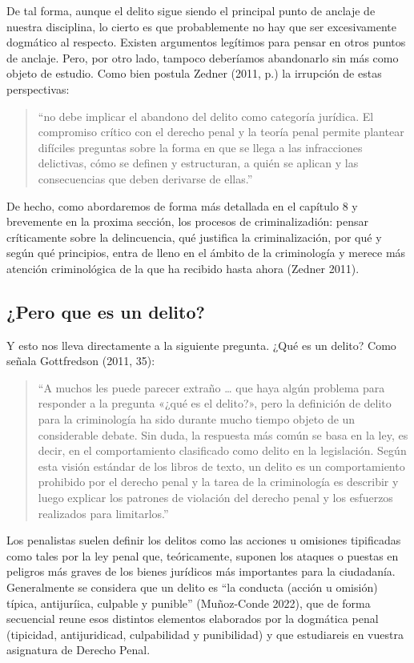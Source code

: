 \documentclass[
  spanish,
  letterpaper,
  DIV=11,
  numbers=noendperiod]{scrreprt}
\begin{document}
De tal forma, aunque el delito sigue siendo el principal punto de
anclaje de nuestra disciplina, lo cierto es que probablemente no hay que
ser excesivamente dogmático al respecto. Existen argumentos legítimos
para pensar en otros puntos de anclaje. Pero, por otro lado, tampoco
deberíamos abandonarlo sin más como objeto de estudio. Como bien postula
Zedner (2011, p.) la irrupción de estas perspectivas:

\begin{quote}
``no debe implicar el abandono del delito como categoría jurídica. El
compromiso crítico con el derecho penal y la teoría penal permite
plantear difíciles preguntas sobre la forma en que se llega a las
infracciones delictivas, cómo se definen y estructuran, a quién se
aplican y las consecuencias que deben derivarse de ellas.''
\end{quote}

De hecho, como abordaremos de forma más detallada en el capítulo 8 y
brevemente en la proxima sección, los procesos de criminalizadión:
pensar críticamente sobre la delincuencia, qué justifica la
criminalización, por qué y según qué principios, entra de lleno en el
ámbito de la criminología y merece más atención criminológica de la que
ha recibido hasta ahora (Zedner 2011).

\subsection{¿Pero que es un delito?}\label{pero-que-es-un-delito}

Y esto nos lleva directamente a la siguiente pregunta. ¿Qué es un
delito? Como señala Gottfredson (2011, 35):

\begin{quote}
``A muchos les puede parecer extraño \ldots{} que haya algún problema
para responder a la pregunta «¿qué es el delito?», pero la definición de
delito para la criminología ha sido durante mucho tiempo objeto de un
considerable debate. Sin duda, la respuesta más común se basa en la ley,
es decir, en el comportamiento clasificado como delito en la
legislación. Según esta visión estándar de los libros de texto, un
delito es un comportamiento prohibido por el derecho penal y la tarea de
la criminología es describir y luego explicar los patrones de violación
del derecho penal y los esfuerzos realizados para limitarlos.''
\end{quote}

Los penalistas suelen definir los delitos como las acciones u omisiones
tipificadas como tales por la ley penal que, teóricamente, suponen los
ataques o puestas en peligros más graves de los bienes jurídicos más
importantes para la ciudadanía. Generalmente se considera que un delito
es ``la conducta (acción u omisión) típica, antijuríica, culpable y
punible'' (Muñoz-Conde 2022), que de forma secuencial reune esos
distintos elementos elaborados por la dogmática penal (tipicidad,
antijuridicad, culpabilidad y punibilidad) y que estudiareis en vuestra
asignatura de Derecho Penal.
\end{document}
